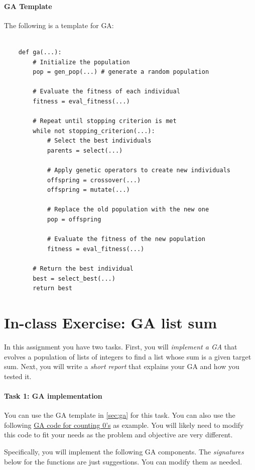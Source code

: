 \documentclass[oneside,11pt,dvipsnames]{book}
\begin{document}
\paragraph{GA Template} The following is a template for GA:
\begin{lstlisting}

    def ga(...):
        # Initialize the population
        pop = gen_pop(...) # generate a random population

        # Evaluate the fitness of each individual
        fitness = eval_fitness(...)

        # Repeat until stopping criterion is met
        while not stopping_criterion(...):
            # Select the best individuals
            parents = select(...)
            
            # Apply genetic operators to create new individuals
            offspring = crossover(...)
            offspring = mutate(...)
            
            # Replace the old population with the new one
            pop = offspring

            # Evaluate the fitness of the new population
            fitness = eval_fitness(...)
            
        # Return the best individual
        best = select_best(...)
        return best
\end{lstlisting}

\section{In-class Exercise: GA list sum}\label{exercise:list-sum-ga}
In this assignment you have two tasks. First, you will \emph{implement a GA} that evolves a population of lists of integers to find a list whose sum is a given target sum. Next, you will write a \emph{short report} that explains your GA and how you tested it.

\paragraph{Task 1: GA implementation}

 You can use the GA template in \autoref{sec:ga} for this task. You can also use the following \href{https://nguyenthanhvuh.github.io/class-oo/ga-example.py}{GA code for counting 0's} as example. You will likely need to modify this code to fit your needs as the problem and objective are very different.
 
 
 Specifically, you will implement the following GA components. The \emph{signatures} below for the functions are just suggestions. You can modify them as needed.
\end{document}
